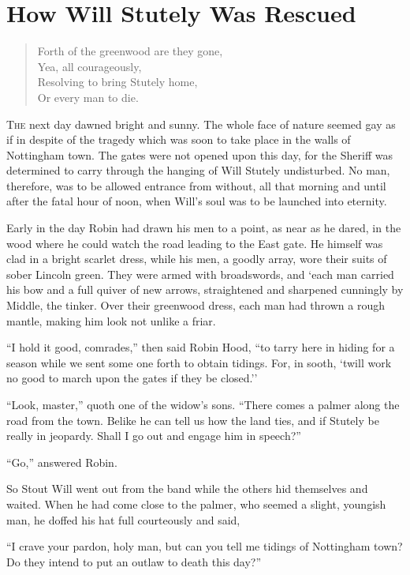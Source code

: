 \chapter{How Will Stutely Was Rescued}

\begin{quote}
Forth of the greenwood are they gone,\\
Yea, all courageously,\\
Resolving to bring Stutely home,\\
Or every man to die.
\end{quote}

\lettrine{T}{he} next day dawned bright and sunny. The whole face of
nature seemed gay as if in despite of the tragedy which was soon to take
place in the walls of Nottingham town. The gates were not opened upon
this day, for the Sheriff was determined to carry through the hanging of
Will Stutely undisturbed. No man, therefore, was to be allowed entrance
from without, all that morning and until after the fatal hour of noon,
when Will's soul was to be launched into eternity.

Early in the day Robin had drawn his men to a point, as near as he
dared, in the wood where he could watch the road leading to the East
gate. He himself was clad in a bright scarlet dress, while his men, a
goodly array, wore their suits of sober Lincoln green. They were armed
with broadswords, and `each man carried his bow and a full quiver of new
arrows, straightened and sharpened cunningly by Middle, the tinker. Over
their greenwood dress, each man had thrown a rough mantle, making him
look not unlike a friar.

``I hold it good, comrades,'' then said Robin Hood, ``to tarry here in
hiding for a season while we sent some one forth to obtain tidings. For,
in sooth, `twill work no good to march upon the gates if they be
closed.''

``Look, master,'' quoth one of the widow's sons. ``There comes a palmer
along the road from the town. Belike he can tell us how the land ties,
and if Stutely be really in jeopardy. Shall I go out and engage him in
speech?''

``Go,'' answered Robin.

So Stout Will went out from the band while the others hid themselves and
waited. When he had come close to the palmer, who seemed a slight,
youngish man, he doffed his hat full courteously and said,

``I crave your pardon, holy man, but can you tell me tidings of
Nottingham town? Do they intend to put an outlaw to death this day?''

